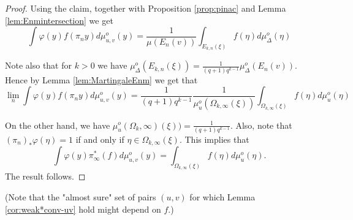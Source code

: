 \documentclass[a4paper, 11pt]{article}
\theoremstyle{plain}
\theoremstyle{definition}
\theoremstyle{remark}
\begin{document}
\begin{proof}
     
     Using the claim, together with Proposition \ref{prop:pinac} and Lemma \ref{lem:Enmintersection} we get
     $$\int \varphi(y) f(\pi_n y) d\mu_{u,v}^o(y)=\frac{1}{\mu(E_n(v))}\int_{E_{k,n}(\xi)} f(\eta) d\mu_\Delta^o(\eta)$$

     Note also that for $k>0$ we have $\mu_\Delta^o(E_{k,n}(\xi))=\frac{1}{(q+1)q^{k-1}}\mu_\Delta^o(E_n(v))$. Hence by Lemma \ref{lem:MartingaleEnm} we get that 
     $$\lim_n\int \varphi(y) f(\pi_n y) d\mu_{u,v}^o(y)=\frac{1}{(q+1)q^{k-1}}\frac{1}{\mu_u^o(\Omega_{k,\infty}(\xi))} \int_{\Omega_{k,\infty}(\xi)}f(\eta)d\mu_u^o(\eta)$$

     On the other hand, we have $\mu_u^o(\Omega_k,\infty)(\xi))=\frac{1}{(q+1)q^{k-1}}$. Also, note that $(\pi_n)_*\varphi(\eta)=1$ if and only if $\eta\in \Omega_{k,\infty}(\xi)$. This implies that
     $$\int \varphi(y) \pi_\infty^* (f) d\mu_{u,v}^o(y) = \int_{\Omega_{k,\infty}(\xi)} f(\eta) d\mu_u^o(\eta). $$
     The result follows.
\end{proof}





(Note that the "almost sure" set of pairs $(u,v)$ for which Lemma \ref{cor:weak*conv-uv} hold
might depend on $f$.)
\end{document}
